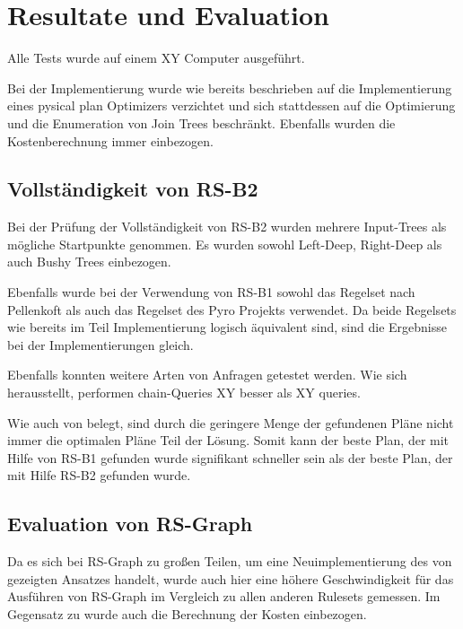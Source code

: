 \chapter{Resultate und Evaluation}

Alle Tests wurde auf einem XY Computer ausgeführt.

Bei der Implementierung wurde wie bereits beschrieben auf die Implementierung eines pysical plan Optimizers verzichtet und sich stattdessen auf die Optimierung und die Enumeration von Join Trees beschränkt. Ebenfalls wurden die Kostenberechnung immer einbezogen.

\section{Vollständigkeit von RS-B2}

Bei der Prüfung der Vollständigkeit von RS-B2 wurden mehrere Input-Trees als mögliche Startpunkte genommen. Es wurden sowohl Left-Deep, Right-Deep als auch Bushy Trees einbezogen. 

Ebenfalls wurde bei der Verwendung von RS-B1 sowohl das Regelset nach Pellenkoft als auch das Regelset des Pyro Projekts verwendet. Da beide Regelsets wie bereits im Teil Implementierung logisch äquivalent sind, sind die Ergebnisse bei der Implementierungen gleich.

Ebenfalls konnten weitere Arten von  Anfragen getestet werden. Wie sich herausstellt, performen chain-Queries XY besser als XY queries.


Wie auch von \cite{XY} belegt, sind durch die geringere Menge der gefundenen Pläne nicht immer die optimalen Pläne Teil der Lösung. Somit kann der beste Plan, der mit Hilfe von RS-B1 gefunden wurde signifikant schneller sein als der beste Plan, der mit Hilfe RS-B2 gefunden wurde. 


\section{Evaluation von RS-Graph}

Da es sich bei RS-Graph zu großen Teilen, um eine Neuimplementierung des von \cite{Moerkotte} gezeigten Ansatzes handelt, wurde auch hier eine höhere Geschwindigkeit für das Ausführen von RS-Graph im Vergleich zu allen anderen Rulesets  gemessen. Im Gegensatz zu \cite{} wurde auch die Berechnung der Kosten einbezogen. 